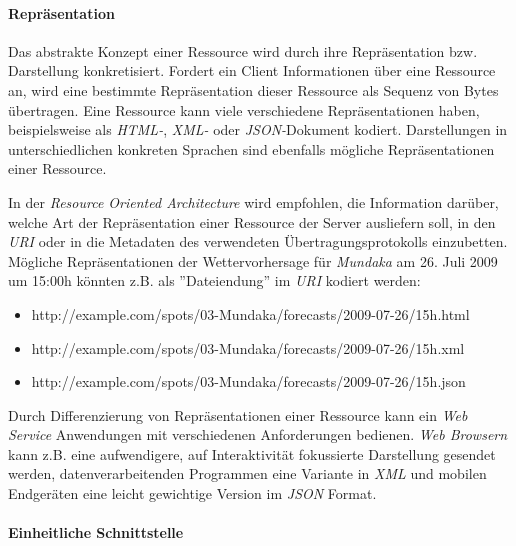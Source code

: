 \paragraph{Repräsentation}
Das abstrakte Konzept einer Ressource wird durch ihre Repräsentation
bzw. Darstellung konkretisiert. Fordert ein Client Informationen über
eine Ressource an, wird eine bestimmte Repräsentation dieser Ressource
als Sequenz von Bytes übertragen. Eine Ressource kann viele
verschiedene Repräsentationen haben, beispielsweise als
\textit{HTML-}, 
\textit{XML-} oder \textit{JSON-}Dokument
 kodiert. Darstellungen
in unterschiedlichen konkreten Sprachen sind ebenfalls mögliche
Repräsentationen einer Ressource.

In der \textit{Resource Oriented Architecture} wird empfohlen, die
Information darüber, welche Art der Repräsentation einer Ressource der
Server ausliefern soll, in den \textit{URI} oder in die Metadaten des
verwendeten Übertragungsprotokolls einzubetten. Mögliche
Repräsentationen der Wettervorhersage für \textit{Mundaka} am 26. Juli
2009 um 15:00h könnten z.B. als ''Dateiendung'' im \textit{URI}
kodiert werden:

{\sf \small
  \begin{itemize}
  \item http://example.com/spots/03-Mundaka/forecasts/2009-07-26/15h.html
  \item http://example.com/spots/03-Mundaka/forecasts/2009-07-26/15h.xml
  \item http://example.com/spots/03-Mundaka/forecasts/2009-07-26/15h.json
  \end{itemize}
}

Durch Differenzierung von Repräsentationen einer Ressource kann ein
\textit{Web Service} Anwendungen mit verschiedenen Anforderungen
bedienen. \textit{Web Browsern} kann z.B. eine aufwendigere, auf
Interaktivität fokussierte Darstellung gesendet werden,
datenverarbeitenden Programmen eine Variante in \textit{XML} und
mobilen Endgeräten eine leicht gewichtige Version im \textit{JSON}
Format.

\paragraph{Einheitliche Schnittstelle}

